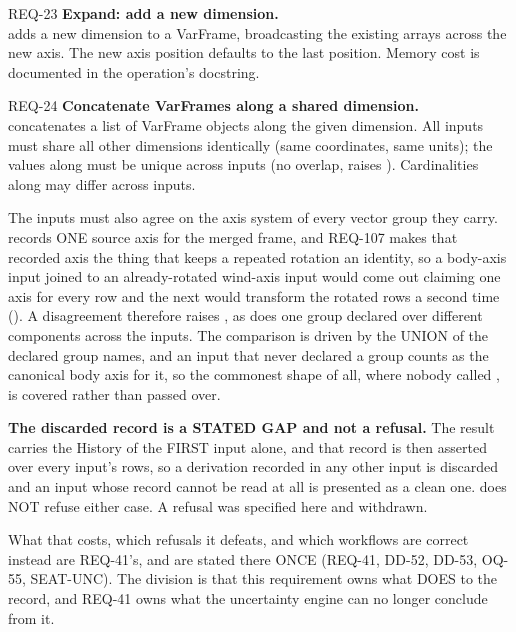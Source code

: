 \begin{reqbox}{REQ-23}{\stable}
\textbf{Expand: add a new dimension.}\\
 adds a new dimension to a
VarFrame, broadcasting the existing arrays across the new axis. The new
axis position defaults to the last position. Memory cost is documented in
the operation's docstring.
\end{reqbox}

\begin{reqbox}{REQ-24}{\stable}
\textbf{Concatenate VarFrames along a shared dimension.}\\
 concatenates a list of VarFrame objects
along the given dimension. All inputs must share all other dimensions
identically (same coordinates, same units); the values along 
must be unique across inputs (no overlap, raises
). Cardinalities along  may differ
across inputs.

The inputs must also agree on the axis system of every vector group they
carry.  records ONE source axis for the merged frame, and
REQ-107 makes that recorded axis the thing that keeps a repeated
rotation an identity, so a body-axis input joined to an already-rotated
wind-axis input would come out claiming one axis for every row and the
next  would transform the rotated rows a second time
(). A disagreement therefore raises , as
does one group declared over different components across the inputs. The
comparison is driven by the UNION of the declared group names, and an
input that never declared a group counts as the canonical body axis for
it, so the commonest shape of all, where nobody called
, is covered rather than passed over.

\textbf{The discarded record is a STATED GAP and not a refusal.} The
result carries the History of the FIRST input alone, and that record is
then asserted over every input's rows, so a derivation recorded in any
other input is discarded and an input whose record cannot be read at all
is presented as a clean one.  does NOT refuse either case.
A refusal was specified here and withdrawn.

What that costs, which refusals it defeats, and which workflows are
correct instead are REQ-41's, and are stated there ONCE (REQ-41, DD-52,
DD-53, OQ-55, SEAT-UNC). The division is that this requirement owns what
 DOES to the record, and REQ-41 owns what the uncertainty
engine can no longer conclude from it.
\end{reqbox}

